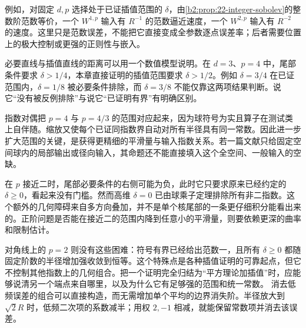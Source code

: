 \ProseParagraphBreak

例如，对固定 \(d,p\) 选择处于已证插值范围的 \(\delta\)，由\cref{b2:prop:22-integer-sobolev}的整数阶范数等价，一个 \(W^{1,p}\) 输入有 \(R^{-1}\) 的范数逼近速度，一个 \(W^{2,p}\) 输入有 \(R^{-2}\) 的速度。这里只是范数误差，不能把它直接变成全参数逐点误差率；后者需要位置上的极大控制或更强的正则性与嵌入。

\ProseParagraphBreak

必要直线与插值直线的距离可以用一个数值模型说明。在 \(d=3\)、\(p=4\) 中，尾部条件要求 \(\delta>1/4\)，本章直接证明的插值范围要求 \(\delta>1/2\)。例如 \(\delta=3/4\) 在已证范围内，\(\delta=1/8\) 被必要条件排除，而 \(\delta=3/8\) 不能仅靠这两项结果判断。说它“没有被反例排除”与说它“已证明有界”有明确区别。

\ProseParagraphBreak

指数对偶把 \(p=4\) 与 \(p=4/3\) 的范围对应起来，因为球符号为实且算子在测试类上自伴随。缩放又使每个已证同指数界自动对所有半径具有同一常数。因此进一步扩大范围的关键，是获得更精细的平滑量与输入指数关系。若一篇文献只给固定空间球内的局部输出或径向输入，其命题还不能直接填入这个全空间、一般输入的空缺。

\ProseParagraphBreak

在 \(p\) 接近二时，尾部必要条件的右侧可能为负，此时它只要求原来已经约定的 \(\delta\geq0\)，看起来没有门槛。然而高维 \(\delta=0\) 已由球乘子定理排除所有非二指数。这个额外的几何障碍来自多方向叠加，并不是单个核尾部的一条更仔细积分能看出来的。正阶问题是否能在接近二的范围内降到任意小的平滑量，则要依赖更深的曲率和限制估计。

\ProseParagraphBreak

对角线上的 \(p=2\) 则没有这些困难：符号有界已经给出范数一，且所有 \(\delta\geq0\) 都随固定阶数的半径增加强收敛到恒等。这个特殊点是各种插值证明的可靠起点，但它不控制其他指数上的几何组合。把一个证明完全归结为“平方理论加插值”时，应能够说清另一个端点来自哪里，以及为什么它有足够强的范围和统一常数。
\ProseParagraphBreak
消去低频误差的组合可以直接构造，而无需增加单个平均的边界消失阶。半径放大到 \(\sqrt2R\) 时，低频二次项的系数减半；用权 \(2,-1\) 相减，就能保留常数项并消去该误差。

